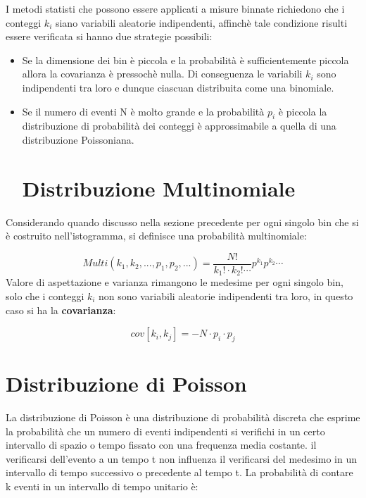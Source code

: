 I metodi statisti che possono essere applicati a misure binnate richiedono che i conteggi $k_{i}$ siano variabili aleatorie indipendenti, affinch\`{e} tale condizione risulti essere verificata si hanno due strategie possibili:

\begin{itemize}
\item
\noindent Se la dimensione dei bin \`{e} piccola e la probabilit\`{a} \`{e} sufficientemente piccola allora la covarianza \`{e} pressoch\`{e} nulla. Di conseguenza le variabili $k_i$ sono indipendenti tra loro e dunque ciascuan distribuita come una binomiale.
\item
\noindent Se il numero di eventi N \`{e} molto grande e la probabilit\`{a} $p_i$ \`{e} piccola la distribuzione di probabilit\`{a} dei conteggi \`{e} approssimabile a quella di una distribuzione Poissoniana. 
\section{Distribuzione Multinomiale}

\end{itemize}

Considerando quando discusso nella sezione precedente per ogni singolo bin che si \`{e} costruito nell'istogramma, si definisce una probabilit\`{a} multinomiale:

\begin{equation}
	Multi(k_1,k_2,...,p_1,p_2,...) = \dfrac{N!}{k_1!\cdot k_2! \cdots}p^{k_{1}}p^{k_2}\cdots
\end{equation}
\newline
\noindent Valore di aspettazione e varianza rimangono le medesime per ogni singolo bin, solo che i conteggi $k_i$ non sono variabili aleatorie indipendenti tra loro, in questo caso si ha la \textbf{covarianza}:

\begin{equation}
	cov[k_i,k_j] = -N \cdot p_i \cdot p_j 
\end{equation}

\section{Distribuzione di Poisson}

La distribuzione di Poisson \`{e} una distribuzione di probabilit\`{a} discreta che esprime la probabilit\`{a} che un numero di eventi indipendenti si verifichi in un certo intervallo di spazio o tempo fissato con una frequenza media costante. il verificarsi dell'evento a un tempo t non influenza il verificarsi del medesimo in un intervallo di tempo successivo o precedente  al tempo t.
La probabilit\`{a} di contare k eventi in un intervallo di tempo unitario \`{e}:

